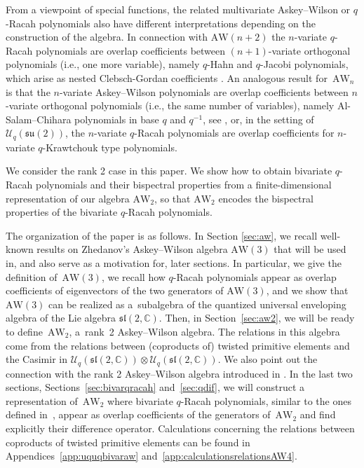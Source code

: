\documentclass[pdftex]{sigma}
\numberwithin{equation}{section}
\newcommand{\CC}{\mathbb{C}}
\newcommand{\aw}{\mathrm{AW}\!\left(3\right)}
\newcommand{\AW}[1]{\mathrm{AW}_{#1}}
\newcommand{\slc}{\mathfrak{sl}(2,\CC)}
\newcommand{\Uq}{\mathcal{U}_q}
\newcommand{\uql}[1][q]{\mathcal{U}_{#1}(\mathfrak{sl}(2,\CC))}
\begin{document}
From a viewpoint of special functions, the related multivariate Askey--Wilson or $q$-Racah polynomials also have different interpretations depending on the construction of the algebra. In connection with $\mathrm{AW}(n+2)$ the $n$-variate $q$-Racah polynomials are overlap coefficients between $(n+1)$-variate orthogonal polynomials (i.e., one more variable), namely $q$-Hahn and $q$-Jacobi polynomials, which arise as nested Clebsch-Gordan coefficients \cite{GIV}. An analogous result for~$\AW{n}$ is that the $n$-variate Askey--Wilson polynomials are overlap coefficients between $n$-variate orthogonal polynomials (i.e., the same number of variables), namely Al-Salam--Chihara polynomials in base $q$ and $q^{-1}$, see \cite{Groenevelt2021}, or, in the setting of $\Uq(\mathfrak{su}(2))$, the $n$-variate $q$-Racah polynomials are overlap coefficients for $n$-variate $q$-Krawtchouk type polynomials.

We consider the rank 2 case in this paper. We show how to obtain bivariate $q$-Racah polynomials and their bispectral properties from a finite-dimensional representation of our algebra $\AW{2}$, so that $\AW{2}$ encodes the bispectral properties of the bivariate $q$-Racah polyno\-mials.

The organization of the paper is as follows. In Section \ref{sec:aw}, we recall well-known results on Zhedanov's Askey--Wilson algebra $\aw$ that will be used in, and also serve as a motivation for, later sections. In particular, we give the definition of~$\aw$, we recall how $q$-Racah polynomials appear as overlap coefficients of eigenvectors of the two generators of $\aw$, and we show that~$\aw$ can be realized as a~subalgebra of the quantized universal enveloping algebra of the Lie algebra $\slc$. Then, in Section~\ref{sec:aw2}, we will be ready to define~$\AW{2}$, a~rank~2 Askey--Wilson algebra. The relations in this algebra come from the relations between (coproducts of) twisted primitive elements and the Casimir in $\uql\otimes \uql$. We also point out the connection with the rank 2 Askey--Wilson algebra introduced in \cite{DeBie2020}. In the last two sections, Sections~\ref{sec:bivarqracah} and~\ref{sec:qdif}, we will construct a representation of~$\AW{2}$ where bivariate $q$-Racah polynomials, similar to the ones defined in~\cite{Gasper2007}, appear as overlap coefficients of the generators of~$\AW{2}$ and find explicitly their difference operator. Calculations concerning the relations between coproducts of twisted primitive elements can be found in Appendices~\ref{app:uquqbivaraw} and~\ref{app:calculationsrelationsAW4}.
\end{document}
